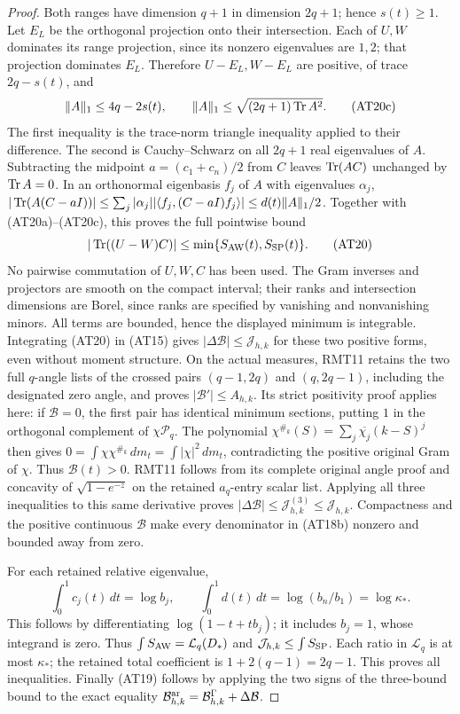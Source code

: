 \begin{proof}
Both ranges have dimension $q+1$ in dimension $2q+1$; hence
$s(t)\ge1$. Let $E_L$ be the orthogonal projection onto their
intersection. Each of $U,W$ dominates its range projection, since
its nonzero eigenvalues are $1,2$; that projection dominates $E_L$.
Therefore $U-E_L,W-E_L$ are positive, of trace $2q-s(t)$, and
\[
 \|A\|_1\le4q-2s(t),\qquad
 \|A\|_1\le\sqrt{(2q+1)\operatorname{Tr} A^2}.
 \tag{AT20c}
\]
The first inequality is the trace-norm triangle inequality applied
to their difference. The second is Cauchy--Schwarz on all $2q+1$
real eigenvalues of $A$. Subtracting the midpoint
$a=(c_1+c_n)/2$ from $C$ leaves $\operatorname{Tr}(AC)$ unchanged by $\operatorname{Tr} A=0$.
In an orthonormal eigenbasis $f_j$ of $A$ with eigenvalues $\alpha_j$,
$|\operatorname{Tr}(A(C-aI))|\le\sum_j|\alpha_j|
|\langle f_j,(C-aI)f_j\rangle|\le d(t)\|A\|_1/2$.
Together with (AT20a)--(AT20c), this proves the full pointwise bound
\[
 |\operatorname{Tr}((U-W)C)|\le\min\{S_{\rm AW}(t),S_{\rm SP}(t)\}.
 \tag{AT20}
\]
No pairwise commutation of $U,W,C$ has been used.
The Gram inverses and projectors are smooth on the compact
interval; their ranks and intersection dimensions are Borel,
since ranks are specified by vanishing and nonvanishing minors.
All terms are bounded, hence the displayed minimum is integrable.
Integrating (AT20) in (AT15) gives
$|\Delta\mathcal B|\le\mathcal J_{h,k}$ for these two positive
forms, even without moment structure. On the actual measures,
RMT11 retains the two full $q$-angle lists of the crossed pairs
$(q-1,2q)$ and $(q,2q-1)$, including the designated zero angle,
and proves $|\mathcal B'|\le A_{h,k}$.
Its strict positivity proof applies here: if $\mathcal B=0$,
the first pair has identical minimum sections, putting $1$ in
the orthogonal complement of $\chi\mathcal P_q$. The polynomial
$\chi^{\#_k}(S)=\sum_j\overline{\chi_j}(k-S)^j$ then gives
$0=\int\chi\chi^{\#_k}\,dm_t=\int|\chi|^2\,dm_t$, contradicting
the positive original Gram of $\chi$. Thus $\mathcal B(t)>0$.
RMT11 follows from its complete original angle proof and concavity
of $\sqrt{1-e^{-z}}$ on the retained $a_q$-entry scalar list.
Applying all three inequalities to this same derivative proves
$|\Delta\mathcal B|\le\mathcal J_{h,k}^{(3)}\le\mathcal J_{h,k}$.
Compactness and the positive continuous $\mathcal B$ make every
denominator in (AT18b) nonzero and bounded away from zero.

For each retained relative eigenvalue,
\[
 \int_0^1 c_j(t)\,dt=\log b_j,\qquad
 \int_0^1d(t)\,dt=\log(b_n/b_1)=\log\kappa_*.
 \tag{AT21}
\]
This follows by differentiating $\log(1-t+tb_j)$; it includes
$b_j=1$, whose integrand is zero. Thus
$\int S_{\rm AW}=\mathcal L_q(D_*)$ and
$\mathcal J_{h,k}\le\int S_{\rm SP}$. Each ratio in
$\mathcal L_q$ is at most $\kappa_*$; the retained total
coefficient is $1+2(q-1)=2q-1$. This proves all inequalities.
Finally (AT19) follows by applying the two signs of the three-bound
bound to the exact equality
$\mathcal B^{\mathrm{ar}}_{h,k}=\mathcal B^\Gamma_{h,k}+\Delta\mathcal B$.
\end{proof}


